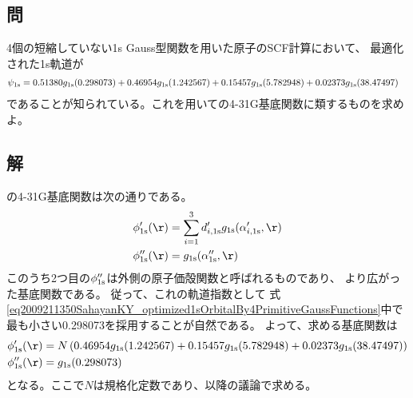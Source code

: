\subsection{問}
4個の短縮していない1s Gauss型関数を用いた原子のSCF計算において、
最適化された1s軌道が
\begin{align}
	\psi_{\rm 1s}
&=
	0.51380 g_{\rm 1s}(0.298073)
	+
	0.46954 g_{\rm 1s}(1.242567)
	+
	0.15457 g_{\rm 1s}(5.782948)
	+
	0.02373 g_{\rm 1s}(38.47497)
	\label{eq2009211350SahayanKY_optimized1sOrbitalBy4PrimitiveGaussFunctions}
\end{align}
であることが知られている。これを用いての4-31G基底関数に類するものを求めよ。

\subsection{解}
の4-31G基底関数は次の通りである。
\begin{align}
	\phi'_{\rm 1s}(\r)
&=
	\sum_{i=1}^{3}
		d'_{i,\rm 1s}
		g_{\rm 1s}(\alpha'_{i,\rm 1s},\r) \\
%
%
	\phi''_{\rm 1s}(\r)
&=
	g_{\rm 1s}(\alpha''_{\rm 1s},\r)
\end{align}
このうち2つ目の$\phi''_{\rm 1s}$は外側の原子価殻関数と呼ばれるものであり、
より広がった基底関数である。
従って、これの軌道指数として
式\ref{eq2009211350SahayanKY_optimized1sOrbitalBy4PrimitiveGaussFunctions}中で
最も小さい0.298073を採用することが自然である。
よって、求める基底関数は
\begin{align}
	\phi'_{\rm 1s}(\r)
&=
	N
	\left(
		0.46954 g_{\rm 1s}(1.242567)
		+
		0.15457 g_{\rm 1s}(5.782948)
		+
		0.02373 g_{\rm 1s}(38.47497)
	\right) \\
%
%
	\phi''_{\rm 1s}(\r)
&=
	g_{\rm 1s}(0.298073)
\end{align}
となる。ここで$N$は規格化定数であり、以降の議論で求める。

